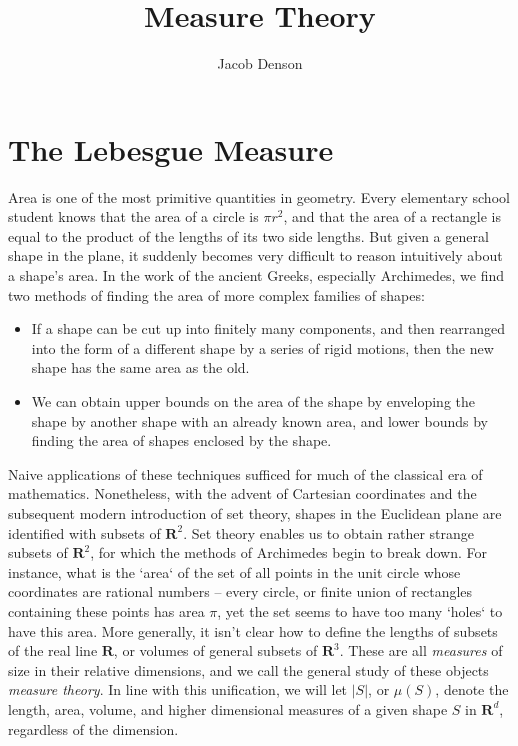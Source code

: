 

\title{Measure Theory}
\author{Jacob Denson}




\maketitle

\tableofcontents


\chapter{The Lebesgue Measure}

Area is one of the most primitive quantities in geometry. Every elementary school student knows that the area of a circle is $\pi r^2$, and that the area of a rectangle is equal to the product of the lengths of its two side lengths. But given a general shape in the plane, it suddenly becomes very difficult to reason intuitively about a shape's area. In the work of the ancient Greeks, especially Archimedes, we find two methods of finding the area of more complex families of shapes:
%
\begin{itemize}
    \item If a shape can be cut up into finitely many components, and then rearranged into the form of a different shape by a series of rigid motions, then the new shape has the same area as the old.

    \item We can obtain upper bounds on the area of the shape by enveloping the shape by another shape with an already known area, and lower bounds by finding the area of shapes enclosed by the shape.
\end{itemize}
%
Naive applications of these techniques sufficed for much of the classical era of mathematics. Nonetheless, with the advent of Cartesian coordinates and the subsequent modern introduction of set theory, shapes in the Euclidean plane are identified with subsets of $\mathbf{R}^2$. Set theory enables us to obtain rather strange subsets of $\mathbf{R}^2$, for which the methods of Archimedes begin to break down. For instance, what is the `area` of the set of all points in the unit circle whose coordinates are rational numbers -- every circle, or finite union of rectangles containing these points has area $\pi$, yet the set seems to have too many `holes` to have this area. More generally, it isn't clear how to define the lengths of subsets of the real line $\mathbf{R}$, or volumes of general subsets of $\mathbf{R}^3$. These are all {\it measures} of size in their relative dimensions, and we call the general study of these objects {\it measure theory}. In line with this unification, we will let $|S|$, or $\mu(S)$, denote the length, area, volume, and higher dimensional measures of a given shape $S$ in $\mathbf{R}^d$, regardless of the dimension.

